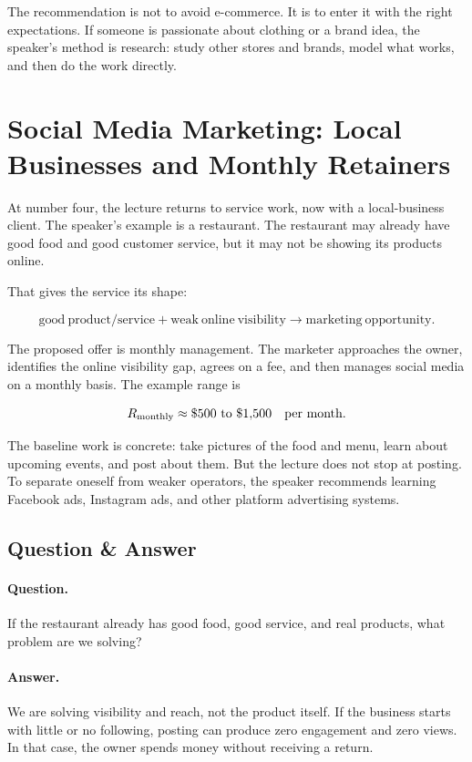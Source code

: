 The recommendation is not to avoid e-commerce. It is to enter it with the right expectations. If someone is passionate about clothing or a brand idea, the speaker's method is research: study other stores and brands, model what works, and then do the work directly.

\section{Social Media Marketing: Local Businesses and Monthly Retainers}

At number four, the lecture returns to service work, now with a local-business client. The speaker's example is a restaurant. The restaurant may already have good food and good customer service, but it may not be showing its products online.

That gives the service its shape:

\begin{equation}
\mathrm{good\ product/service}
+
\mathrm{weak\ online\ visibility}
\longrightarrow
\mathrm{marketing\ opportunity}.
\end{equation}

The proposed offer is monthly management. The marketer approaches the owner, identifies the online visibility gap, agrees on a fee, and then manages social media on a monthly basis. The example range is

\begin{equation}
R_{\mathrm{monthly}}
\approx
\$500 \hbox{ to } \$1{,}500
\quad \hbox{per month}.
\end{equation}

The baseline work is concrete: take pictures of the food and menu, learn about upcoming events, and post about them. But the lecture does not stop at posting. To separate oneself from weaker operators, the speaker recommends learning Facebook ads, Instagram ads, and other platform advertising systems.

\subsection{Question \& Answer}

\paragraph{Question.}
If the restaurant already has good food, good service, and real products, what problem are we solving?

\paragraph{Answer.}
We are solving visibility and reach, not the product itself. If the business starts with little or no following, posting can produce zero engagement and zero views. In that case, the owner spends money without receiving a return.

